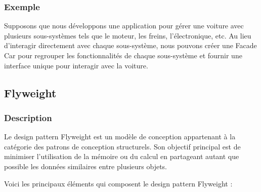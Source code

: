 \subsubsection{Exemple}

Supposons que nous développons une application pour gérer une voiture avec plusieurs sous-systèmes tels que le moteur, les freins, l'électronique, etc. Au lieu d'interagir directement avec chaque sous-système, nous pouvons créer une Facade Car pour regrouper les fonctionnalités de chaque sous-système et fournir une interface unique pour interagir avec la voiture.




\newpage

\subsection{Flyweight}

\subsubsection{Description}

Le design pattern Flyweight est un modèle de conception appartenant à la catégorie des patrons de conception structurels. Son objectif principal est de minimiser l'utilisation de la mémoire ou du calcul en partageant autant que possible les données similaires entre plusieurs objets.

Voici les principaux éléments qui composent le design pattern Flyweight :

